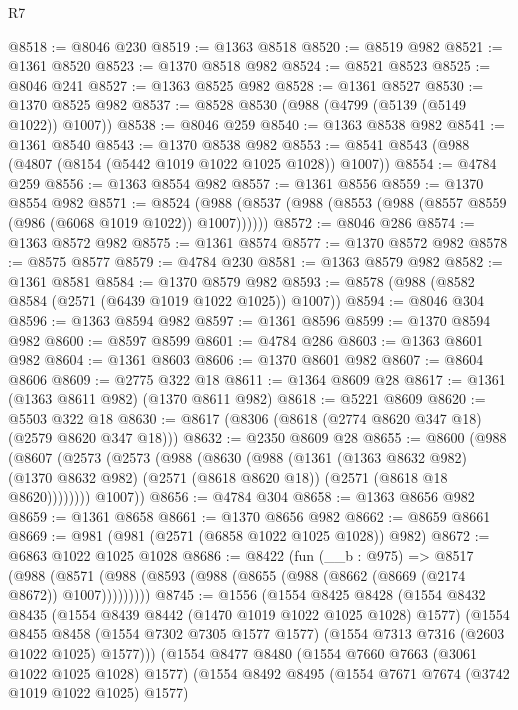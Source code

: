 \begin{lexlean}{R7}
\begin{coremodule}
@8518 := @8046 @230
@8519 := @1363 @8518
@8520 := @8519 @982
@8521 := @1361 @8520
@8523 := @1370 @8518 @982
@8524 := @8521 @8523
@8525 := @8046 @241
@8527 := @1363 @8525 @982
@8528 := @1361 @8527
@8530 := @1370 @8525 @982
@8537 := @8528 @8530 (@988 (@4799 (@5139 (@5149 @1022)) @1007))
@8538 := @8046 @259
@8540 := @1363 @8538 @982
@8541 := @1361 @8540
@8543 := @1370 @8538 @982
@8553 := @8541 @8543 (@988 (@4807 (@8154 (@5442 @1019 @1022 @1025 @1028)) @1007))
@8554 := @4784 @259
@8556 := @1363 @8554 @982
@8557 := @1361 @8556
@8559 := @1370 @8554 @982
@8571 := @8524 (@988 (@8537 (@988 (@8553 (@988 (@8557 @8559 (@986 (@6068 @1019 @1022)) @1007))))))
@8572 := @8046 @286
@8574 := @1363 @8572 @982
@8575 := @1361 @8574
@8577 := @1370 @8572 @982
@8578 := @8575 @8577
@8579 := @4784 @230
@8581 := @1363 @8579 @982
@8582 := @1361 @8581
@8584 := @1370 @8579 @982
@8593 := @8578 (@988 (@8582 @8584 (@2571 (@6439 @1019 @1022 @1025)) @1007))
@8594 := @8046 @304
@8596 := @1363 @8594 @982
@8597 := @1361 @8596
@8599 := @1370 @8594 @982
@8600 := @8597 @8599
@8601 := @4784 @286
@8603 := @1363 @8601 @982
@8604 := @1361 @8603
@8606 := @1370 @8601 @982
@8607 := @8604 @8606
@8609 := @2775 @322 @18
@8611 := @1364 @8609 @28
@8617 := @1361 (@1363 @8611 @982) (@1370 @8611 @982)
@8618 := @5221 @8609
@8620 := @5503 @322 @18
@8630 := @8617 (@8306 (@8618 (@2774 @8620 @347 @18) (@2579 @8620 @347 @18)))
@8632 := @2350 @8609 @28
@8655 := @8600
    (@988
      (@8607
        (@2573
          (@2573
            (@988
              (@8630
                (@988
                  (@1361
                    (@1363 @8632 @982)
                    (@1370 @8632 @982)
                    (@2571 (@8618 @8620 @18))
                    (@2571 (@8618 @18 @8620))))))))
        @1007))
@8656 := @4784 @304
@8658 := @1363 @8656 @982
@8659 := @1361 @8658
@8661 := @1370 @8656 @982
@8662 := @8659 @8661
@8669 := @981 (@981 (@2571 (@6858 @1022 @1025 @1028)) @982)
@8672 := @6863 @1022 @1025 @1028
@8686 := @8422
    (fun (__b : @975) =>
    @8517 (@988 (@8571 (@988 (@8593 (@988 (@8655 (@988 (@8662 (@8669 (@2174 @8672)) @1007)))))))))
@8745 := @1556
    (@1554
      @8425
      @8428
      (@1554
        @8432
        @8435
        (@1554 @8439 @8442 (@1470 @1019 @1022 @1025 @1028) @1577)
        (@1554
          @8455
          @8458
          (@1554 @7302 @7305 @1577 @1577)
          (@1554 @7313 @7316 (@2603 @1022 @1025) @1577)))
      (@1554
        @8477
        @8480
        (@1554 @7660 @7663 (@3061 @1022 @1025 @1028) @1577)
        (@1554
          @8492
          @8495
          (@1554 @7671 @7674 (@3742 @1019 @1022 @1025) @1577)

\end{coremodule}
\end{lexlean}
